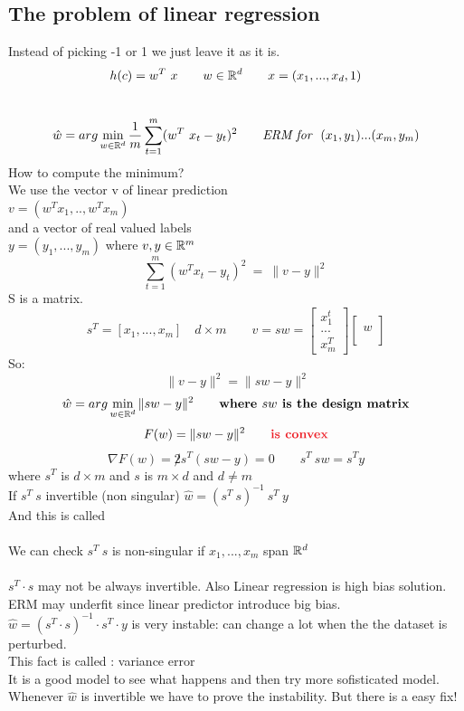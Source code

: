 \documentclass[../main.tex]{subfiles}
\begin{document}
\subsection{The problem of linear regression}
Instead of picking -1 or 1 we just leave it as it is. 
$$h(c) = w^T \ x \qquad w \in \mathbb{R}^d \qquad x = (x_1, ..., x_d, 1) $$
\\
$$
\hat{w} = arg \min_{w \in \mathbb{R}^d} \frac{1}{m} \sum_{t=1}^{m} (w^T \ x_t- y_t ) ^2 \qquad \textit{ERM for } \ (x_1,y_1) ... (x_m, y_m)
$$
How to compute the minimum? \\
We use the vector v of linear prediction\\
$v = (w^T x_1, .., w^T x_m )$
\\
and a vector of real valued labels\\
$y = (y_1, ..., y_m) $ where $v, y \in \mathbb{R}^m$
\\
$$
\sum_{t=1}^{m} (w^T x_t - y_t ) ^2  \ = \ \| v - y\|^2 
$$
S is a matrix.
$$
s^T = \left[ x_1, ... , x_m \right] \quad d \times m
\qquad
v = s w = 
\begin{bmatrix}
x^t_1 \\ ...\\  x^T_m
\end{bmatrix}
\begin{bmatrix}
\\
w
\\\\
\end{bmatrix}
$$
So:
$$
\ \| v - y\|^2  = \| sw - y\|^2
$$
$$
\hat{w} = arg \min_{w \in \mathbb{R}^d} \| sw - y \| ^2 \qquad \textbf{where $sw$ is the design matrix}
$$
$$
F (w) = \| sw - y \|^2 \qquad \bred{is convex}
$$
$$
\nabla F(w) = \not2 s^T \left( sw - y \right) = 0 \qquad s^T\ s w = s^T y
$$
where $s^T$ is $d \times m$ and $s$ is $m \times d$ and $ d \neq m$
\\
If $s^T \ s$ invertible (non singular)
$ \hat{w} = (s^T \ s)^{-1} \ s^T \ y $\\
And this is called 
\\\\
We can check $s^T\ s$ is non-singular if $x_1, ... , x_m$ span $\mathbb{R}^d$
\\\\
$s^T \cdot s$ may not be always invertible. Also Linear regression is high bias solution. ERM may underfit since linear predictor introduce big bias.
\\
$ \hat{w} = ( s^T \cdot s)^{-1} \cdot s^T \cdot y $ is very instable: can change a lot when the the dataset is perturbed.
\\
This fact is called  : variance error
\\
It is a good model to see what happens and then try more sofisticated model. 
\\
Whenever $\hat{w}$ is invertible we have to prove the instability. But there is a easy fix!
\\\\
\end{document}

